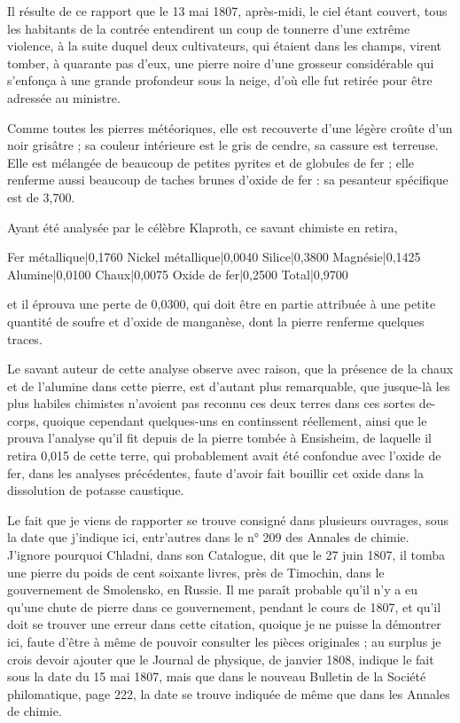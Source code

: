 \documentclass[a4paper, 12pt, oneside, french]{article}
\begin{document}
Il résulte de ce rapport que le 13 mai 1807, après-midi, le ciel étant couvert, tous les habitants de la contrée entendirent un coup de tonnerre d'une extrême violence, à la suite duquel deux cultivateurs, qui étaient dans les champs, virent tomber, à quarante pas d'eux, une pierre noire d'une grosseur considérable qui s'enfonça à une grande profondeur sous la neige, d'où elle fut retirée pour être adressée au ministre.

Comme toutes les pierres météoriques, elle est recouverte d'une légère croûte d'un noir grisâtre ; sa couleur intérieure est le gris de cendre, sa cassure est terreuse. Elle est mélangée de beaucoup de petites pyrites et de globules de fer ; elle renferme aussi beaucoup de taches brunes d'oxide de fer : sa pesanteur spécifique est de 3,700.

Ayant été analysée par le célèbre Klaproth, ce savant chimiste en retira,

Fer métallique|0,1760  
Nickel métallique|0,0040  
Silice|0,3800  
Magnésie|0,1425  
Alumine|0,0100  
Chaux|0,0075  
Oxide de fer|0,2500  
Total|0,9700

et il éprouva une perte de 0,0300, qui doit être en partie attribuée à une petite quantité de soufre et d'oxide de manganèse, dont la pierre renferme quelques traces.

Le savant auteur de cette analyse observe avec raison, que la présence de la chaux et de l'alumine dans cette pierre, est d'autant plus remarquable, que jusque-là les plus habiles chimistes n'avoient pas reconnu ces deux terres dans ces sortes de-corps, quoique cependant quelques-uns en continssent réellement, ainsi que le prouva l'analyse qu'il fit depuis de la pierre tombée à Ensisheim, de laquelle il retira 0,015 de cette terre, qui probablement avait été confondue avec l'oxide de fer, dans les analyses précédentes, faute d'avoir fait bouillir cet oxide dans la dissolution de potasse caustique.

Le fait que je viens de rapporter se trouve consigné dans plusieurs ouvrages, sous la date que j'indique ici, entr'autres dans le n° 209 des Annales de chimie. J'ignore pourquoi Chladni, dans son Catalogue, dit que le 27 juin 1807, il tomba une pierre du poids de cent soixante livres, près de Timochin, dans le gouvernement de Smolensko, en Russie. Il me paraît probable qu'il n'y a eu qu'une chute de pierre dans ce gouvernement, pendant le cours de 1807, et qu'il doit se trouver une erreur dans cette citation, quoique je ne puisse la démontrer ici, faute d'être à même de pouvoir consulter les pièces originales ; au surplus je crois devoir ajouter que le Journal de physique, de janvier 1808, indique le fait sous la date du 15 mai 1807, mais que dans le nouveau Bulletin de la Société philomatique, page 222, la date se trouve indiquée de même que dans les Annales de chimie.
\end{document}
